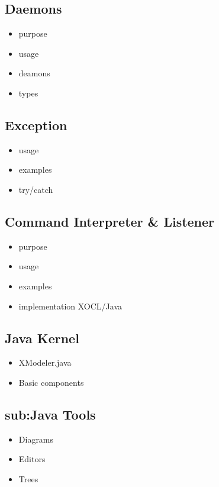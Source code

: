 \documentclass[10pt,a4paper]{report}
\begin{document}
\subsection{Daemons}
\label{sub:Daemons}
\begin{itemize}
\item purpose
\item usage
\item deamons
\item types
\end{itemize}

\subsection{Exception}
\label{sub:Exception}
\begin{itemize}
\item usage
\item examples
\item try/catch
\end{itemize}

\subsection{Command Interpreter \& Listener}
\label{sub:Command InterpreterAndListener}
\begin{itemize}
\item purpose
\item usage
\item examples
\item implementation XOCL/Java
\end{itemize}

\subsection{Java Kernel}
\label{sub:Java Kernel}
\begin{itemize}
\item XModeler.java
\item Basic components
\end{itemize}

\subsection{sub:Java Tools}
\label{sub:Java Tools}
\begin{itemize}
\item Diagrams
\item Editors
\item Trees
\end{itemize}
\end{document}
